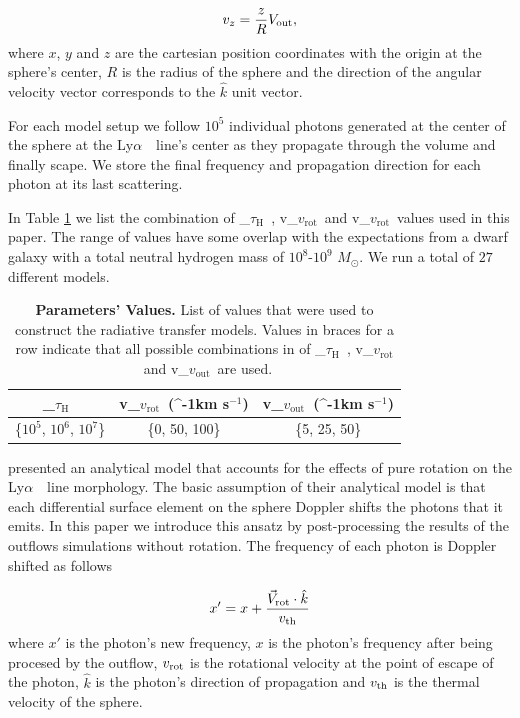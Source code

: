 \documentclass[a4paper,fleqn,usenatbib]{mnras}
\newcommand{\lya}{\ifmmode{{\rm Ly}\alpha}\else Ly$\alpha$\ \fi}
\newcommand{\kms}{\ifmmode\mathrm{km\ s}^{-1}\else km s$^{-1}$\fi}
\newcommand{\vrot}{\ifmmode\mathrm v_{\mathrm{rot}}\else $v_{\mathrm{rot}}$~\fi}
\newcommand{\vout}{\ifmmode\mathrm v_{\mathrm{out}}\else $v_{\mathrm{out}}$~\fi}
\newcommand{\tauh}{\ifmmode\mathrm \tau_{\mathrm{H}}\else $\tau_{\mathrm{H}}$~\fi}
\begin{document}
\begin{equation}
	v_{z}=\frac{z}{R}V_{\rm out},
	\label{eq:vz}
\end{equation}
%
where $x$, $y$ and $z$ are the cartesian position coordinates with the
origin at the sphere's center, $R$ is the radius of the sphere and the
direction of the angular velocity vector corresponds to the $\hat{k}$
unit vector.

For each model setup we follow $10^5$ individual photons generated at
the center of the sphere at the \lya\ line's center as they propagate
through the volume and finally scape.
We store the final frequency and propagation direction for each photon
at its last scattering.

In Table \ref{tab:values} we list the combination of \tauh,
\vrot and \vrot values used in this paper.
The range of values have some overlap with the expectations from a dwarf
galaxy with a total neutral hydrogen mass of $10^8$-$10^9$ $M_{\odot}$.
We run a total of $27$ different models.

\begin{table}
  \begin{center}
    \begin{tabular}{|c|c|c|}
      \hline
      \tauh & \vrot (\kms) & \vout (\kms) \\
      \hline
      \{$10^5$, $10^6$, $10^7$\}  & \{0, 50, 100\} & \{5, 25, 50\} \\
      \hline
    \end{tabular}
  \end{center}
  \caption{\textbf{Parameters' Values.} List of values that were used
    to construct the radiative transfer models. Values in braces
    for a row indicate that all possible combinations in of
    \tauh, \vrot and \vout are used.}
  \label{tab:values}
\end{table}



\cite{Garavito14} presented an analytical model that
accounts for the effects of pure rotation on the
\lya\ line morphology. 
The basic assumption of their analytical model is that each
differential surface element on the sphere Doppler shifts the photons
that it emits.
In this paper we introduce this ansatz by post-processing the results
of the outflows simulations without rotation.
The frequency of each photon is Doppler shifted as follows

\begin{equation}
x' = x + \frac{\vec{V}_{\rm rot}\cdot\hat{k}}{v_{\rm th}}
\label{eq:shift_x}
\end{equation}
%
where $x'$ is the photon's new frequency, $x$ is the photon's
frequency after being procesed by the outflow, $v_{\rm rot}$ is the 
rotational velocity at the point of escape of the photon, $\hat{k}$ is
the photon's direction of propagation and $v_{\rm th}$ is the thermal
velocity of the sphere.
\end{document}
